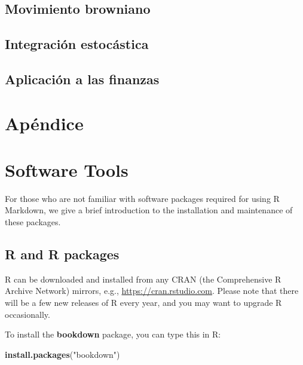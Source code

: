 \documentclass[12pt,]{krantz}
\makeatletter
\newenvironment{Shaded}{\begin{snugshade}}{\end{snugshade}}
\newcommand{\KeywordTok}[1]{\textcolor[rgb]{0.13,0.29,0.53}{\textbf{#1}}}
\newcommand{\StringTok}[1]{\textcolor[rgb]{0.31,0.60,0.02}{#1}}
\newcommand{\NormalTok}[1]{#1}
\newenvironment{kframe}{%
\medskip{}
\setlength{\fboxsep}{.8em}
 \def\at@end@of@kframe{}%
 \ifinner\ifhmode%
  \def\at@end@of@kframe{\end{minipage}}%
  \begin{minipage}{\columnwidth}%
 \fi\fi%
 \def\FrameCommand##1{\hskip\@totalleftmargin \hskip-\fboxsep
 \colorbox{shadecolor}{##1}\hskip-\fboxsep
     \hskip-\linewidth \hskip-\@totalleftmargin \hskip\columnwidth}%
 \MakeFramed {\advance\hsize-\width
   \@totalleftmargin\z@ \linewidth\hsize
   \@setminipage}}%
 {\par\unskip\endMakeFramed%
 \at@end@of@kframe}
\renewenvironment{Shaded}{\begin{kframe}}{\end{kframe}}
\theoremstyle{definition}
\theoremstyle{definition}
\theoremstyle{definition}
\theoremstyle{remark}
\makeatother
\begin{document}
\section{Movimiento browniano}\label{movimiento-browniano}

\section{Integración estocástica}\label{integracion-estocastica}

\section{Aplicación a las finanzas}\label{aplicacion-a-las-finanzas}

\chapter{Apéndice}\label{apendice}

\cleardoublepage 

\appendix {}


\chapter{Software Tools}\label{software-tools}

For those who are not familiar with software packages required for using
R Markdown, we give a brief introduction to the installation and
maintenance of these packages.

\section{R and R packages}\label{r-and-r-packages}

R can be downloaded and installed from any CRAN (the Comprehensive R
Archive Network) mirrors, e.g., \url{https://cran.rstudio.com}. Please
note that there will be a few new releases of R every year, and you may
want to upgrade R occasionally.

To install the \textbf{bookdown} package, you can type this in R:

\begin{Shaded}
\begin{Highlighting}[]
\KeywordTok{install.packages}\NormalTok{(}\StringTok{"bookdown"}\NormalTok{)}
\end{Highlighting}
\end{Shaded}
\end{document}
